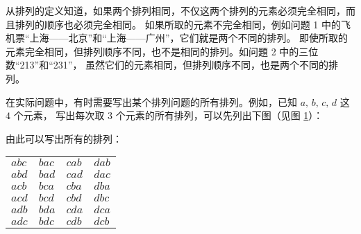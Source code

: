 从排列的定义知道，如果两个排列相同，不仅这两个排列的元素必须完全相同，而且排列的顺序也必须完全相同。
如果所取的元素不完全相同，例如问题 1 中的飞机票“上海——北京”和“上海——广州”，它们就是两个不同的排列。
即使所取的元素完全相同，但排列顺序不同，也不是相同的排列。如问題 2 中的三位数“213”和“231”，
虽然它们的元素相同，但排列顺序不同，也是两个不同的排列。

在实际问题中，有时需要写出某个排列问题的所有排列。例如，已知 $a,\, b,\, c,\, d$ 这 $4$ 个元素，
写出每次取 $3$ 个元素的所有排列，可以先列出下图（见图 \ref{fig:2-2}）：

\begin{figure}[htbp]
    \centering
    
    \caption{}\label{fig:2-2}
\end{figure}

由此可以写出所有的排列：
\begin{table}[H]
    \centering
    \begin{tabular}{*{4}{w{c}{3em}}}
        $abc$ & $bac$ & $cab$ & $dab$ \\
        $abd$ & $bad$ & $cad$ & $dac$ \\
        $acb$ & $bca$ & $cba$ & $dba$ \\
        $acd$ & $bcd$ & $cbd$ & $dbc$ \\
        $adb$ & $bda$ & $cda$ & $dca$ \\
        $adc$ & $bdc$ & $cdb$ & $dcb$
    \end{tabular}
\end{table}




